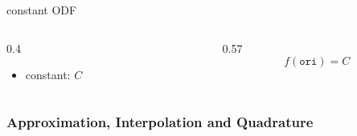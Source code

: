 \documentclass[compress,aspectratio=1610,fleqn]{beamer}
\begin{document}
\begin{frame}
   constant ODF
  \begin{columns}
    \begin{column}{0.4\textwidth}
      \begin{itemize}
      \item constant: $C$
    \end{itemize}
  \end{column}
    \begin{column}{0.57\textwidth}
      \begin{equation*}
        f(\mathtt{ori}) = C
      \end{equation*}
    \end{column}
  \end{columns}

\end{frame}


\begin{frame}
  \frametitle{Approximation, Interpolation and Quadrature}
  
\end{frame}
\end{document}
